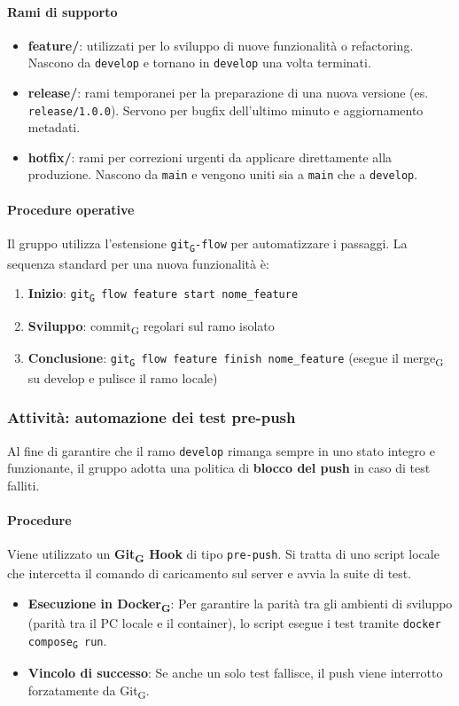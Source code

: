 \documentclass[11pt,a4paper]{article}
\newcommand{\gls}[1]{#1\textsubscript{G}}
\begin{document}
\paragraph{Rami di supporto}
\begin{itemize}
    \item \textbf{feature/}: utilizzati per lo sviluppo di nuove funzionalità o refactoring. Nascono da \texttt{develop} e tornano in \texttt{develop} una volta terminati.
    \item \textbf{release/}: rami temporanei per la preparazione di una nuova versione (es. \texttt{release/1.0.0}). Servono per bugfix dell'ultimo minuto e aggiornamento metadati.
    \item \textbf{hotfix/}: rami per correzioni urgenti da applicare direttamente alla produzione. Nascono da \texttt{main} e vengono uniti sia a \texttt{main} che a \texttt{develop}.
\end{itemize}

\paragraph{Procedure operative}
Il gruppo utilizza l'estensione \texttt{\gls{git}-flow} per automatizzare i passaggi. La sequenza standard per una nuova funzionalità è:
\begin{enumerate}
    \item \textbf{Inizio}: \texttt{\gls{git} flow feature start nome\_feature}
    \item \textbf{Sviluppo}: \gls{commit} regolari sul ramo isolato
    \item \textbf{Conclusione}: \texttt{\gls{git} flow feature finish nome\_feature} (esegue il \gls{merge} su develop e pulisce il ramo locale)
\end{enumerate}

\subsubsection{Attività: automazione dei test pre-push}
Al fine di garantire che il ramo \texttt{develop} rimanga sempre in uno stato integro e funzionante, il gruppo adotta una politica di \textbf{blocco del push} in caso di test falliti.

\paragraph{Procedure}
Viene utilizzato un \textbf{\gls{Git} Hook} di tipo \texttt{pre-push}. Si tratta di uno script locale che intercetta il comando di caricamento sul server e avvia la suite di test.
\begin{itemize}
    \item \textbf{Esecuzione in \gls{Docker}}: Per garantire la parità tra gli ambienti di sviluppo (parità tra il PC locale e il container), lo script esegue i test tramite \texttt{\gls{docker compose} run}.
    \item \textbf{Vincolo di successo}: Se anche un solo test fallisce, il push viene interrotto forzatamente da \gls{Git}.
\end{itemize}
\end{document}
